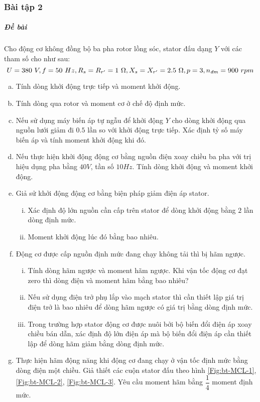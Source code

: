 \documentclass[12pt,a4paper]{article}
\begin{document}
\subsubsection{Bài tập 2}
\subparagraph{Đề bài}
Cho động cơ không đồng bộ ba pha rotor lồng sóc, stator đấu dạng $Y$ với các tham số cho như sau: $$U = 380 \unit{V}, f = 50 \unit{Hz}, R_s = R_{r^ \prime}  = 1 \unit{\Omega}, X_s = X_{r^ \prime}  = 2.5 \unit{\Omega}, p = 3, \vitalic{n} = 900 \unit{rpm}$$
\begin{enumerate}[a.]
\item Tính dòng khởi động trực tiếp và moment khởi động.
\item Tính dòng qua rotor và moment cơ ở chế độ định mức.
\item Nếu sử dụng máy biến áp tự ngẫu để khởi động $Y$ cho dòng khởi động qua nguồn lưới giảm đi $0.5$ lần so với khởi động trực tiếp. Xác định tỷ số máy biến áp và tính moment khởi động khi đó.
\item Nếu thực hiện khởi động động cơ bằng nguồn điện xoay chiều ba pha với trị hiệu dụng pha bằng $40 \unit{V}$, tần số $10 \unit{Hz}$. Tính dòng khởi động và moment khởi động.
\item Giả sử khởi động động cơ bằng biện pháp giảm điện áp stator.
\begin{enumerate}[i.]
\item Xác định độ lớn nguồn cần cấp trên stator để dòng khởi động bằng $2$ lần dòng định mức.
\item Moment khởi động lúc đó bằng bao nhiêu.
\end{enumerate}
\item Động cơ được cấp nguồn định mức đang chạy không tải thì bị hãm ngược.
\begin{enumerate}[i.]
\item Tính dòng hãm ngược và moment hãm ngược. Khi vận tốc động cơ đạt zero thì dòng điện và moment hãm bằng bao nhiêu?
\item Nếu sử dụng điện trở phụ lắp vào mạch stator thì cần thiết lập giá trị điện trở là bao nhiêu để dòng hãm ngược có giá trị bằng dòng định mức.
\item Trong trường hợp stator động cơ được nuôi bởi bộ biến đổi điện áp xoay chiều bán dẫn, xác định độ lớn điện áp mà bộ biến đổi điện áp cần thiết lập để dòng hãm giảm bằng dòng định mức.
\end{enumerate}
\item Thực hiện hãm động năng khi động cơ đang chạy ở vận tốc định mức bằng dòng điện một chiều. Giả thiết các cuộn stator đấu theo hình \ref{Fig:bt-MCL-1}, \ref{Fig:bt-MCL-2}, \ref{Fig:bt-MCL-3}. Yêu cầu moment hãm bằng $\dfrac{1}{4}$ moment định mức.

\end{enumerate}
\end{document}
